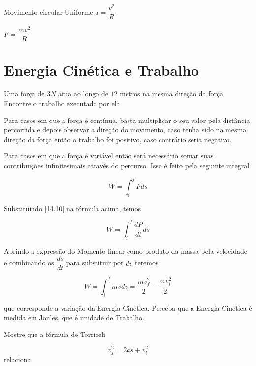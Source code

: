 Movimento circular Uniforme
$a=\dfrac{v^2}{R}$

$F=\dfrac{mv^2}{R}$

\section{Energia Cinética e Trabalho}

\begin{exe}
Uma força de $3N$ atua ao longo de $12$ metros na mesma direção da força. Encontre o trabalho executado por ela.
\end{exe}

Para casos em que a força é contínua, basta multiplicar o seu valor pela distância percorrida e depois observar a direção do movimento, caso tenha sido na mesma direção da força então o trabalho foi positivo, caso contrário seria negativo.

Para casos em que a força é variável então será necessário somar suas contribuições infinitesimais através do percurso. Isso é feito pela seguinte integral

\begin{equation}\label{14.14}
    W=\int_i^f F ds
\end{equation}

Substituindo \eqref{14.10} na fórmula acima, temos

\begin{equation}\label{14.15}
    W=\int_i^f \dfrac{dP}{dt} ds
\end{equation}

Abrindo a expressão do Momento linear como produto da massa pela velocidade e combinando os $\dfrac{ds}{dt}$ para substituir por $dv$ teremos

\begin{equation}\label{14.16}
    W=\int_i^f mv dv= \dfrac{mv_f^2}{2}-\dfrac{mv_i^2}{2}
\end{equation}

que corresponde a variação da Energia Cinética. Perceba que a Energia Cinética é medida em Joules, que é unidade de Trabalho.

Mostre que a fórmula de Torriceli 

\begin{equation}\label{14.17}
    v_f^2=2as+v_i^2
\end{equation}
relaciona


